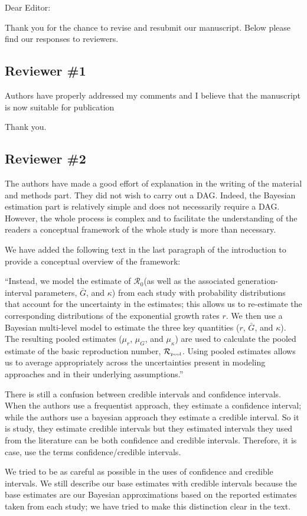 \documentclass[12pt]{article}
\newcommand{\Ro}{\ensuremath{{\mathcal R}_{0}}\xspace}
\newcommand{\Rpool}{\ensuremath{{\mathcal R}_{\textrm{\tiny{pool}}}}\xspace}
\newcommand{\rev}{\subsection*}
\newcommand{\revtext}{\textsf}
\begin{document}
\noindent Dear Editor:

Thank you for the chance to revise and resubmit our manuscript.
Below please find our responses to reviewers.

\rev{Reviewer \#1}

\revtext{Authors have properly addressed my comments and I believe that the manuscript is now suitable for publication}

Thank you.

\rev{Reviewer \#2}

\revtext{
The authors have made a good effort of explanation in the writing of the material and methods
part. They did not wish to carry out a DAG. Indeed, the Bayesian estimation part is relatively
simple and does not necessarily require a DAG. However, the whole process is complex and
to facilitate the understanding of the readers a conceptual framework of the whole study is
more than necessary.}

We have added the following text in the last paragraph of the introduction to provide a conceptual overview of the framework:

``Instead, we model the estimate of \Ro (as well as the associated generation-interval parameters, $\bar G$, and $\kappa$) from each study with probability distributions that account for the uncertainty in the estimates;
this allows us to re-estimate the corresponding distributions of the exponential growth rates $r$.
We then use a Bayesian multi-level model to estimate the three  key quantities ($r$, $\bar G$, and $\kappa$).
The resulting pooled estimates ($\mu_r$, $\mu_G$, and $\mu_\kappa$) are used to calculate the pooled estimate of the basic reproduction number, \Rpool.
Using pooled estimates allows us to average appropriately across the uncertainties present in modeling approaches and in their underlying assumptions.''

\revtext{There is still a confusion between credible intervals and confidence
intervals. When the authors use a frequentist approach, they estimate a confidence interval;
while the authors use a bayesian approach they estimate a credible interval. So it is study,
they estimate credible intervals but they estimated intervals they used from the literature can
be both confidence and credible intervals. Therefore, it is case, use the terms
confidence/credible intervals.}

We tried to be as careful as possible in the uses of confidence and credible intervals.
We still describe our base estimates with credible intervals because the base estimates are our Bayesian approximations based on the reported estimates taken from each study; we have tried to make this distinction clear in the text.
\end{document}
